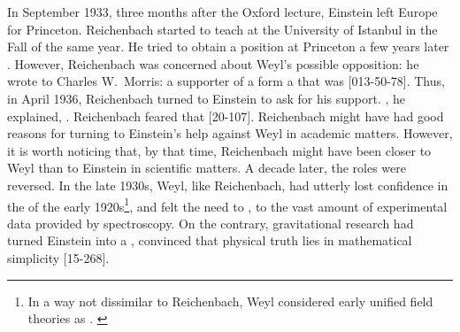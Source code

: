 \documentclass[final]{article}
\begin{document}
In September 1933, three months after the Oxford lecture, Einstein left Europe for Princeton. Reichenbach started to teach at the University of Istanbul in the Fall of the same year. He tried to obtain a position at Princeton a few years later \citep{Verhaegh2020a}. However, Reichenbach was concerned about Weyl's possible opposition:  he wrote to Charles W.\ Morris: a supporter of a form a  that was  [013-50-78]. Thus, in April 1936, Reichenbach turned to Einstein to ask for his support. , he explained, . Reichenbach feared that  [20-107]. Reichenbach might have had good reasons for turning to Einstein's help against Weyl in academic matters. However, it is worth noticing that, by that time, Reichenbach might have been closer to Weyl than to Einstein in scientific matters. A decade later, the roles were reversed. In the late 1930s, Weyl, like Reichenbach, had utterly lost confidence in the  of the early 1920s\footnote{In a way not dissimilar to Reichenbach, Weyl considered early unified field theories as .
\citep[343]{Weyl1931}}, and felt the need to  \citep[343]{Weyl1931}, to the vast amount of experimental data provided by spectroscopy. On the contrary, gravitational research had turned Einstein into a  \citep{Ryckman2014}, convinced that physical truth lies in mathematical simplicity [15-268].

%
%
%
%
%
%
%
\end{document}
